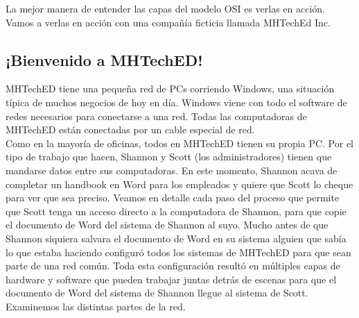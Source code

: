 \documentclass[12pt]{report}
\begin{document}
La mejor manera de entender las capas del modelo OSI es verlas en acción. 
Vamos a verlas en acción con una compañía ficticia llamada MHTechEd Inc.\\

\subsection{¡Bienvenido a MHTechED!}
MHTechED tiene una pequeña red de PCs corriendo Windows, una situación
típica de muchos negocios de hoy en día. Windows viene con todo el software de
redes necesarios para conectarse a una red. Todas las computadoras de MHTechED
están conectadas por un cable especial de red.\\
Como en la mayoría de oficinas, todos en MHTechED tienen su propia PC.
Por el tipo de trabajo que hacen, Shannon y Scott (los administradores)
tienen que mandarse datos entre sus computadoras. En este momento,
Shannon acava de completar un handbook en Word para los empleados y quiere
que Scott lo cheque para ver que sea preciso. Veamos en detalle cada paso 
del proceso que permite que Scott tenga un acceso directo a la computadora 
de Shannon, para que copie el documento de Word del sistema de Shannon al suyo.
Mucho antes de que Shannon siquiera salvara el documento de Word en su sistema
alguien que sabía lo que estaba haciendo configuró todos los sistemas de 
MHTechED para que sean parte de una red común. Toda esta configuración
resultó en múltiples capas de hardware y software que pueden trabajar juntas 
detrás de escenas para que el documento de Word del sistema de Shannon
llegue al sistema de Scott. Examinemos las distintas partes de la red.
\end{document}
